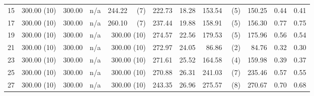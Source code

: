 \documentclass[11pt,fleqn,twoside]{article}
\begin{document}
\begin{table}[t]
\begin{tabular}[t]{|r|r|r|r|r|r|r|r|r|r|r|}
15      & 300.00 (10) & 300.00     & n/a     & 244.22 ~~(7) & 222.73     & 18.28     & 153.54 ~~(5) & 150.25     & 0.44     & 0.41     \\
17      & 300.00 (10) & 300.00     & n/a     & 260.10 ~~(7) & 237.44     & 19.88     & 158.91 ~~(5) & 156.30     & 0.77     & 0.75     \\
19      & 300.00 (10) & 300.00     & n/a     & 300.00 (10) & 274.57     & 22.56     & 179.53 ~~(5) & 175.96     & 0.56     & 0.54     \\
21      & 300.00 (10) & 300.00     & n/a     & 300.00 (10) & 272.97     & 24.05     & 86.86 ~~(2) & 84.76     & 0.32     & 0.30     \\
23      & 300.00 (10) & 300.00     & n/a    & 300.00 (10) & 271.61     & 25.52     & 164.58 ~~(4) & 159.98     & 0.39     & 0.37     \\
25      & 300.00 (10) & 300.00     & n/a     & 300.00 (10) & 270.88     & 26.31     & 241.03 ~~(7) & 235.46     & 0.57     & 0.55     \\
27      & 300.00 (10) & 300.00     & n/a     & 300.00 (10) & 243.35     & 26.96     & 275.57 ~~(8) & 270.67     & 0.70     & 0.68     \\

\end{tabular}
\end{table}
\end{document}
